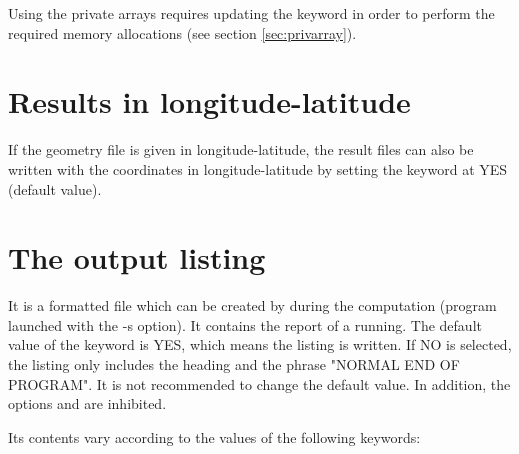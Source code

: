Using the private arrays requires updating the keyword  in order to perform the required memory allocations (see
section \ref{sec:privarray}).

\section{Results in longitude-latitude}
If the geometry file is given in longitude-latitude, the result files
can also be written with the coordinates in longitude-latitude
by setting the keyword 
at YES (default value).

\section{The output listing}

It is a formatted file which can be created by  during the
computation (program launched with the -s option). It contains the report of a
 running.
The default value of the keyword  is YES,
which means the listing is written.
If NO is selected, the listing only includes the heading and the
phrase "NORMAL END OF PROGRAM".
It is not recommended to change the default value.
In addition, the options  and  are inhibited.

Its contents vary according to the values of the following keywords:

